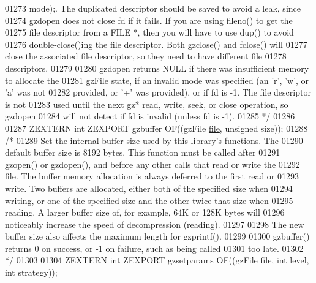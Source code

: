 \begin{DoxyCode}
01273 \textcolor{comment}{   mode);.  The duplicated descriptor should be saved to avoid a leak, since}
01274 \textcolor{comment}{   gzdopen does not close fd if it fails.  If you are using fileno() to get the}
01275 \textcolor{comment}{   file descriptor from a FILE *, then you will have to use dup() to avoid}
01276 \textcolor{comment}{   double-close()ing the file descriptor.  Both gzclose() and fclose() will}
01277 \textcolor{comment}{   close the associated file descriptor, so they need to have different file}
01278 \textcolor{comment}{   descriptors.}
01279 \textcolor{comment}{}
01280 \textcolor{comment}{     gzdopen returns NULL if there was insufficient memory to allocate the}
01281 \textcolor{comment}{   gzFile state, if an invalid mode was specified (an 'r', 'w', or 'a' was not}
01282 \textcolor{comment}{   provided, or '+' was provided), or if fd is -1.  The file descriptor is not}
01283 \textcolor{comment}{   used until the next gz* read, write, seek, or close operation, so gzdopen}
01284 \textcolor{comment}{   will not detect if fd is invalid (unless fd is -1).}
01285 \textcolor{comment}{*/}
01286 
01287 ZEXTERN \textcolor{keywordtype}{int} ZEXPORT gzbuffer OF((gzFile \hyperlink{structfile}{file}, \textcolor{keywordtype}{unsigned} size));
01288 \textcolor{comment}{/*}
01289 \textcolor{comment}{     Set the internal buffer size used by this library's functions.  The}
01290 \textcolor{comment}{   default buffer size is 8192 bytes.  This function must be called after}
01291 \textcolor{comment}{   gzopen() or gzdopen(), and before any other calls that read or write the}
01292 \textcolor{comment}{   file.  The buffer memory allocation is always deferred to the first read or}
01293 \textcolor{comment}{   write.  Two buffers are allocated, either both of the specified size when}
01294 \textcolor{comment}{   writing, or one of the specified size and the other twice that size when}
01295 \textcolor{comment}{   reading.  A larger buffer size of, for example, 64K or 128K bytes will}
01296 \textcolor{comment}{   noticeably increase the speed of decompression (reading).}
01297 \textcolor{comment}{}
01298 \textcolor{comment}{     The new buffer size also affects the maximum length for gzprintf().}
01299 \textcolor{comment}{}
01300 \textcolor{comment}{     gzbuffer() returns 0 on success, or -1 on failure, such as being called}
01301 \textcolor{comment}{   too late.}
01302 \textcolor{comment}{*/}
01303 
01304 ZEXTERN \textcolor{keywordtype}{int} ZEXPORT gzsetparams OF((gzFile file, \textcolor{keywordtype}{int} level, \textcolor{keywordtype}{int} strategy));

\end{DoxyCode}

